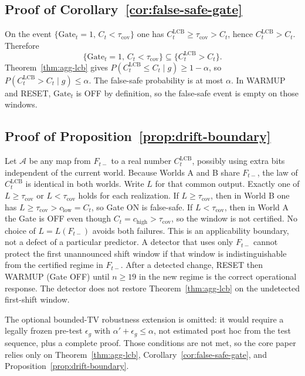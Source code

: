 \subsection{Proof of Corollary~\ref{cor:false-safe-gate}}
\label{app:proof_false_safe}

On the event $\{\mathrm{Gate}_t=1,\,C_t<\tau_{\mathrm{cov}}\}$ one has
$C^{\mathrm{LCB}}_t\ge\tau_{\mathrm{cov}}>C_t$, hence
$C^{\mathrm{LCB}}_t>C_t$.  Therefore
\[
 \{\mathrm{Gate}_t=1,\,C_t<\tau_{\mathrm{cov}}\}
 \subseteq
 \{C^{\mathrm{LCB}}_t>C_t\}.
\]
Theorem~\ref{thm:agg-lcb} gives $P(C^{\mathrm{LCB}}_t\le C_t\mid g)\ge 1-\alpha$,
so $P(C^{\mathrm{LCB}}_t>C_t\mid g)\le\alpha$.  The false-safe probability is
at most $\alpha$.  In WARMUP and RESET, $\mathrm{Gate}_t$ is OFF by definition,
so the false-safe event is empty on those windows.

\subsection{Proof of Proposition~\ref{prop:drift-boundary}}
\label{app:proof_drift_boundary}

Let $\mathcal{A}$ be any map from $F_{t-}$ to a real number
$C^{\mathrm{LCB}}_t$, possibly using extra bits independent of the current
world.  Because Worlds A and B share $F_{t-}$, the law of
$C^{\mathrm{LCB}}_t$ is identical in both worlds.  Write $L$ for that common
output.  Exactly one of $L\ge\tau_{\mathrm{cov}}$ or $L<\tau_{\mathrm{cov}}$
holds for each realization.  If $L\ge\tau_{\mathrm{cov}}$, then in World B one
has $L\ge\tau_{\mathrm{cov}}>c_{\mathrm{low}}=C_t$, so Gate ON is false-safe.
If $L<\tau_{\mathrm{cov}}$, then in World A the Gate is OFF even though
$C_t=c_{\mathrm{high}}>\tau_{\mathrm{cov}}$, so the window is not certified.
No choice of $L=L(F_{t-})$ avoids both failures.  This is an applicability
boundary, not a defect of a particular predictor.  A detector that uses only
$F_{t-}$ cannot protect the first unannounced shift window if that window is
indistinguishable from the certified regime in $F_{t-}$.  After a detected
change, RESET then WARMUP (Gate OFF) until $n\ge 19$ in the new regime is the
correct operational response.  The detector does not restore
Theorem~\ref{thm:agg-lcb} on the undetected first-shift window.

The optional bounded-TV robustness extension is omitted: it would require a
legally frozen pre-test $\epsilon_g$ with $\alpha'+\epsilon_g\le\alpha$, not
estimated post hoc from the test sequence, plus a complete proof.  Those
conditions are not met, so the core paper relies only on
Theorem~\ref{thm:agg-lcb}, Corollary~\ref{cor:false-safe-gate}, and
Proposition~\ref{prop:drift-boundary}.


